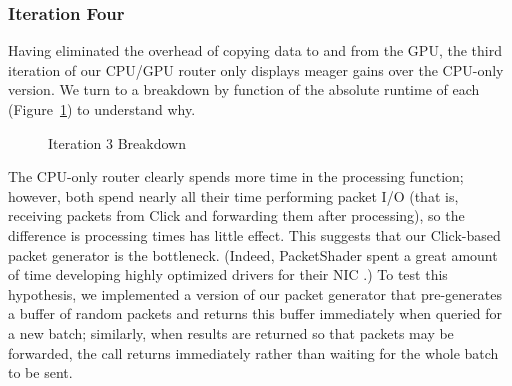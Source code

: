\subsubsection{Iteration Four}

Having eliminated the overhead of copying data to and from the GPU, the third
iteration of our CPU/GPU router only displays meager gains over the CPU-only
version. We turn to a breakdown by function of the absolute runtime of each
(Figure~\ref{fig:iter3-breakdown}) to understand why.
\begin{figure}
    \centering
	\quad

    \caption{Iteration 3 Breakdown}
	\label{fig:iter3-breakdown}
\end{figure}

The CPU-only router clearly spends more time in the processing function;
however, both spend nearly all their time performing packet I/O (that is,
receiving packets from Click and forwarding them after processing), so the
difference is processing times has little effect. This suggests that our
Click-based packet generator is the bottleneck. (Indeed, PacketShader spent a
great amount of time developing highly optimized drivers for their NIC
\cite{Han}.) To test this hypothesis, we implemented a version of our packet
generator that pre-generates a buffer of random packets and returns this buffer
immediately when queried for a new batch; similarly, when results are returned
so that packets may be forwarded, the call returns immediately rather than
waiting for the whole batch to be sent.

